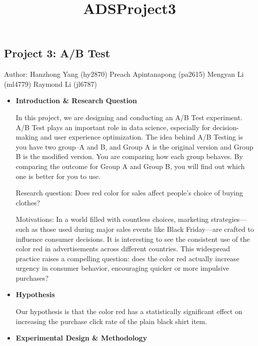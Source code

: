 \documentclass[
  letterpaper,
  DIV=11,
  numbers=noendperiod]{scrartcl}
\title{ADSProject3}
\author{}
\date{}
\begin{document}
\maketitle


\subsection{Project 3: A/B Test}\label{project-3-ab-test}

Author: Hanzhong Yang (hy2870) Preach Apintanapong (pa2615) Mengyan Li
(ml4779) Raymond Li (jl6787)

\begin{itemize}
\item
  \textbf{Introduction \& Research Question}

  In this project, we are designing and conducting an A/B Test
  experiment. A/B Test plays an important role in data science,
  especially for decision-making and user experience optimization. The
  idea behind A/B Testing is you have two group--A and B, and Group A is
  the original version and Group B is the modified version. You are
  comparing how each group behaves. By comparing the outcome for Group A
  and Group B, you will find out which one is better for you to use.

  Research question: Does red color for sales affect people's choice of
  buying clothes?

  Motivations: In a world filled with countless choices, marketing
  strategies---such as those used during major sales events like Black
  Friday---are crafted to influence consumer decisions. It is
  interesting to see the consistent use of the color red in
  advertisements across different countries. This widespread practice
  raises a compelling question: does the color red actually increase
  urgency in consumer behavior, encouraging quicker or more impulsive
  purchases?
\item
  \textbf{Hypothesis}

  Our hypothesis is that the color red has a statistically significant
  effect on increasing the purchase click rate of the plain black shirt
  item.\\
\item
  \textbf{Experimental Design \& Methodology}


\end{itemize}
\end{document}
